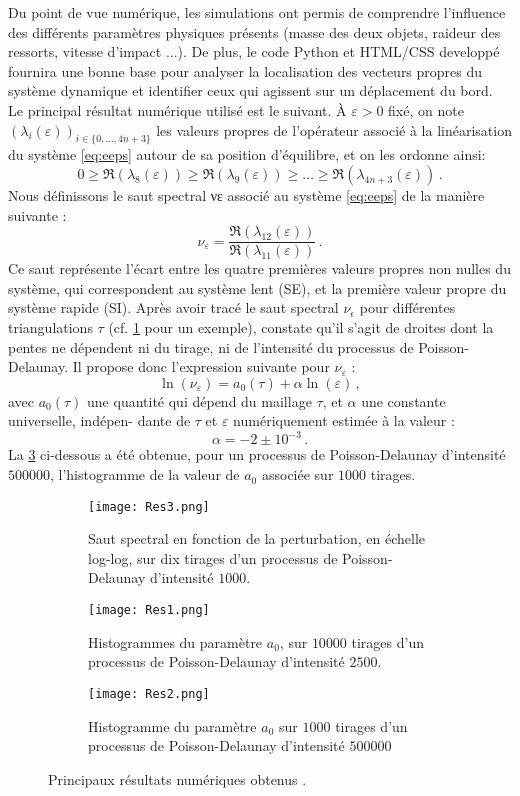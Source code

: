 Du point de vue numérique, les simulations ont permis de comprendre l’influence des différents paramètres physiques présents (masse des deux objets, raideur des ressorts, vitesse d’impact ...). De plus, le code Python et HTML/CSS developpé fournira une bonne base pour analyser la localisation des vecteurs propres du système dynamique et identifier ceux qui agissent sur un déplacement du bord. Le principal résultat numérique utilisé est le suivant. À $\varepsilon > 0$ fixé, on note $(\lambda_i (\varepsilon))_{i \in \{0,...,4n+3\}}$ les valeurs propres de l’opérateur associé à la linéarisation du système \cref{eq:eeps} autour de sa position d’équilibre, et on les ordonne ainsi:
$$
0 \geq \mathfrak{R}(\lambda_8(\varepsilon)) \geq \mathfrak{R}(\lambda_9(\varepsilon)) \geq \ldots \geq \mathfrak{R}(\lambda_{4n+3}(\varepsilon)) \,.
$$
Nous définissons le saut spectral νε associé au système \cref{eq:eeps} de la manière suivante :
$$
\nu_{\varepsilon} = \frac{\mathfrak{R}(\lambda_{12}(\varepsilon))}{\mathfrak{R}(\lambda_{11}(\varepsilon))} \,.
$$
Ce saut représente l’écart entre les quatre premières valeurs propres non nulles du système, qui correspondent au système lent (SE), et la première valeur propre du système rapide (SI). Après avoir tracé le saut spectral $\nu_{\epsilon}$ pour différentes triangulations $\tau$ (cf. \cref{fig:res3} pour un exemple), \citeauthor{balasoiu2020halthesis} constate qu'il s'agit de droites dont la pentes ne dépendent ni du tirage, ni de l’intensité du processus de Poisson-Delaunay. Il propose donc l’expression suivante pour $\nu_{\varepsilon}$ :
$$
\ln(\nu_{\varepsilon}) = a_0(\tau) + \alpha \ln(\varepsilon) \,,
$$
avec $a_0 (\tau)$ une quantité qui dépend du maillage $\tau$, et $\alpha$ une constante universelle, indépen-
dante de $\tau$ et $\varepsilon$ numériquement estimée à la valeur :
$$\alpha = −2 \pm 10^{−3} \,.$$
La \cref{fig:res2} ci-dessous a été obtenue, pour un processus de Poisson-Delaunay d’intensité $500 000$, l’histogramme de la valeur de $a_0$ associée sur $1 000$ tirages.
\begin{figure}[H]
    \centering
    \begin{subfigure}{0.29\textwidth}
        \texttt{[image: Res3.png]}
        \caption{Saut spectral en fonction de la perturbation, en échelle log-log, sur dix tirages d’un processus de Poisson-Delaunay d’intensité $1000$.}
        \label{fig:res3}
    \end{subfigure}
    \begin{subfigure}{0.3\textwidth}
        \texttt{[image: Res1.png]}
        \caption{Histogrammes du paramètre $a_0$, sur $10 000$ tirages d’un processus de Poisson-Delaunay d’intensité $2500$.}
    \end{subfigure}
    \begin{subfigure}{0.3\textwidth}
        \texttt{[image: Res2.png]}
        \caption{Histogramme du paramètre $a_0$ sur $1 000$ tirages d’un processus de Poisson-Delaunay d’intensité $500 000$}
        \label{fig:res2}
    \end{subfigure}
    \caption{Principaux résultats numériques obtenus \parencite[p.199]{balasoiu2020halthesis}.}
\end{figure}
